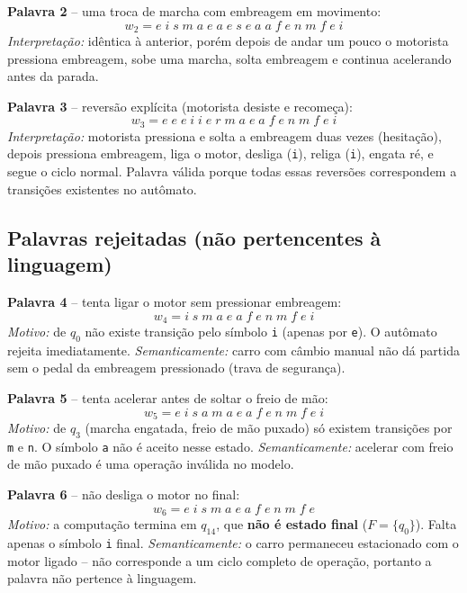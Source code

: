 \documentclass[12pt,a4paper]{article}
\begin{document}
\vspace{0.3cm}
\textbf{Palavra 2} -- uma troca de marcha com embreagem em movimento:
\[
w_2 = e\;i\;s\;m\;a\;e\;a\;e\;s\;e\;a\;a\;f\;e\;n\;m\;f\;e\;i
\]
\emph{Interpretação:} idêntica à anterior, porém depois de andar um pouco o motorista pressiona embreagem, sobe uma marcha, solta embreagem e continua acelerando antes da parada.

\vspace{0.3cm}
\textbf{Palavra 3} -- reversão explícita (motorista desiste e recomeça):
\[
w_3 = e\;e\;e\;i\;i\;e\;r\;m\;a\;e\;a\;f\;e\;n\;m\;f\;e\;i
\]
\emph{Interpretação:} motorista pressiona e solta a embreagem duas vezes (hesitação), depois pressiona embreagem, liga o motor, desliga (\texttt{i}), religa (\texttt{i}), engata ré, e segue o ciclo normal. Palavra válida porque todas essas reversões correspondem a transições existentes no autômato.

\subsection{Palavras rejeitadas (não pertencentes à linguagem)}

\textbf{Palavra 4} -- tenta ligar o motor sem pressionar embreagem:
\[
w_4 = i\;s\;m\;a\;e\;a\;f\;e\;n\;m\;f\;e\;i
\]
\emph{Motivo:} de $q_0$ não existe transição pelo símbolo \texttt{i} (apenas por \texttt{e}). O autômato rejeita imediatamente. \emph{Semanticamente:} carro com câmbio manual não dá partida sem o pedal da embreagem pressionado (trava de segurança).

\vspace{0.3cm}
\textbf{Palavra 5} -- tenta acelerar antes de soltar o freio de mão:
\[
w_5 = e\;i\;s\;a\;m\;a\;e\;a\;f\;e\;n\;m\;f\;e\;i
\]
\emph{Motivo:} de $q_3$ (marcha engatada, freio de mão puxado) só existem transições por \texttt{m} e \texttt{n}. O símbolo \texttt{a} não é aceito nesse estado. \emph{Semanticamente:} acelerar com freio de mão puxado é uma operação inválida no modelo.

\vspace{0.3cm}
\textbf{Palavra 6} -- não desliga o motor no final:
\[
w_6 = e\;i\;s\;m\;a\;e\;a\;f\;e\;n\;m\;f\;e
\]
\emph{Motivo:} a computação termina em $q_{14}$, que \textbf{não é estado final} ($F = \{q_0\}$). Falta apenas o símbolo \texttt{i} final. \emph{Semanticamente:} o carro permaneceu estacionado com o motor ligado -- não corresponde a um ciclo completo de operação, portanto a palavra não pertence à linguagem.
\end{document}
